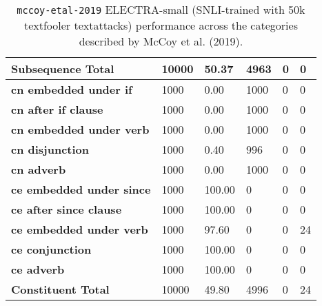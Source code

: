 \documentclass[11pt,a4paper]{article}
\begin{document}
\begin{table}[!hbt]
\begin{tabular}{p{}|p{} p{} p{} p{} p{} }
        \textbf{Subsequence Total} & 10000 & 50.37 & 4963 & 0 & 0 \\
        \hline
        \textbf{cn embedded under if} & 1000 & 0.00 & 1000 & 0 & 0 \\
        \textbf{cn after if clause} & 1000 & 0.00 & 1000 & 0 & 0 \\
        \textbf{cn embedded under verb} & 1000 & 0.00 & 1000 & 0 & 0 \\
        \textbf{cn disjunction} & 1000 & 0.40 & 996 & 0 & 0 \\
        \textbf{cn adverb} & 1000 & 0.00 & 1000 & 0 & 0 \\
        \textbf{ce embedded under since} & 1000 & 100.00 & 0 & 0 & 0 \\
        \textbf{ce after since clause} & 1000 & 100.00 & 0 & 0 & 0 \\
        \textbf{ce embedded under verb} & 1000 & 97.60 & 0 & 0 & 24 \\
        \textbf{ce conjunction} & 1000 & 100.00 & 0 & 0 & 0 \\
        \textbf{ce adverb} & 1000 & 100.00 & 0 & 0 & 0 \\
        \textbf{Constituent Total} & 10000 & 49.80 & 4996 & 0 & 24 \\
    \end{tabular}
    \caption{\texttt{mccoy-etal-2019} ELECTRA-small (SNLI-trained with 50k textfooler textattacks) performance across the categories described by McCoy et al. (2019).}
\end{table}
\end{document}
